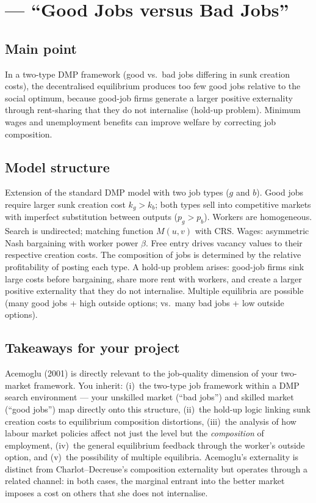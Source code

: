 \documentclass[12pt]{article}
\begin{document}
\section{\citet{acemoglu2001} --- ``Good Jobs versus Bad Jobs''}

\subsection*{Main point}

In a two-type DMP framework (good vs.\ bad jobs differing in sunk creation costs), the decentralised equilibrium produces too few good jobs relative to the social optimum, because good-job firms generate a larger positive externality through rent-sharing that they do not internalise (hold-up problem). Minimum wages and unemployment benefits can improve welfare by correcting job composition.

\subsection*{Model structure}

Extension of the standard DMP model with two job types ($g$ and $b$). Good jobs require larger sunk creation cost $k_g > k_b$; both types sell into competitive markets with imperfect substitution between outputs ($p_g > p_b$). Workers are homogeneous. Search is undirected; matching function $M(u,v)$ with CRS. Wages: asymmetric Nash bargaining with worker power $\beta$. Free entry drives vacancy values to their respective creation costs. The composition of jobs is determined by the relative profitability of posting each type. A hold-up problem arises: good-job firms sink large costs before bargaining, share more rent with workers, and create a larger positive externality that they do not internalise. Multiple equilibria are possible (many good jobs + high outside options; vs.\ many bad jobs + low outside options).

\subsection*{Takeaways for your project}

Acemoglu (2001) is directly relevant to the job-quality dimension of your two-market framework. You inherit: (i)~the two-type job framework within a DMP search environment --- your unskilled market (``bad jobs'') and skilled market (``good jobs'') map directly onto this structure, (ii)~the hold-up logic linking sunk creation costs to equilibrium composition distortions, (iii)~the analysis of how labour market policies affect not just the level but the \emph{composition} of employment, (iv)~the general equilibrium feedback through the worker's outside option, and (v)~the possibility of multiple equilibria. Acemoglu's externality is distinct from Charlot--Decreuse's composition externality but operates through a related channel: in both cases, the marginal entrant into the better market imposes a cost on others that she does not internalise.
\end{document}
